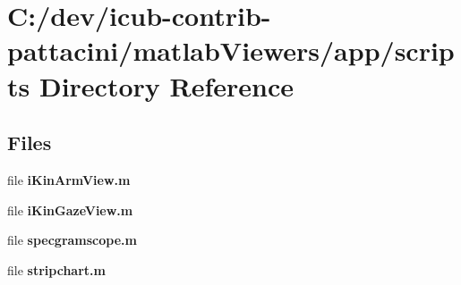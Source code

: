 \section{C\+:/dev/icub-\/contrib-\/pattacini/matlab\+Viewers/app/scripts Directory Reference}
\label{dir_64961f17a3708b3df53571064252b2d4}
\subsection*{Files}
\begin{DoxyCompactItemize}
\item 
file {\bfseries i\+Kin\+Arm\+View.\+m}
\item 
file {\bfseries i\+Kin\+Gaze\+View.\+m}
\item 
file {\bfseries specgramscope.\+m}
\item 
file {\bfseries stripchart.\+m}
\end{DoxyCompactItemize}
